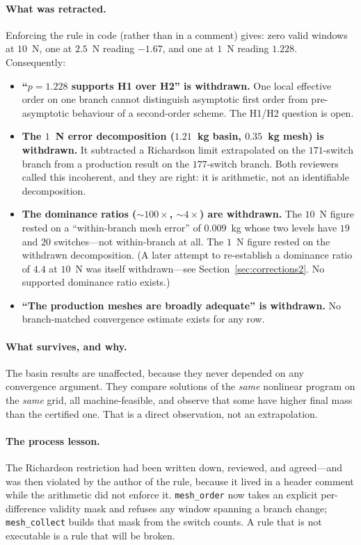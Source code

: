 \documentclass[11pt]{article}
\begin{document}
\paragraph{What was retracted.} Enforcing the rule in code (rather than in a
comment) gives: zero valid windows at $10$~N, one at $2.5$~N reading $-1.67$,
and one at $1$~N reading $1.228$. Consequently:

\begin{itemize}
  \item \textbf{``$p = 1.228$ supports H1 over H2'' is withdrawn.} One local
  effective order on one branch cannot distinguish asymptotic first order from
  pre-asymptotic behaviour of a second-order scheme. The H1/H2 question is
  open.
  \item \textbf{The $1$~N error decomposition ($1.21$~kg basin, $0.35$~kg
  mesh) is withdrawn.} It subtracted a Richardson limit extrapolated on the
  $171$-switch branch from a production result on the $177$-switch branch.
  Both reviewers called this incoherent, and they are right: it is arithmetic,
  not an identifiable decomposition.
  \item \textbf{The dominance ratios ($\sim\!100\times$, $\sim\!4\times$)
  are withdrawn.} The $10$~N figure rested on a ``within-branch mesh error'' of
  $0.009$~kg whose two levels have $19$ and $20$ switches---not within-branch
  at all. The $1$~N figure rested on the withdrawn decomposition.
  (A later attempt to re-establish a dominance ratio of $4.4$ at $10$~N was
  itself withdrawn---see Section~\ref{sec:corrections2}. No supported dominance
  ratio exists.)
  \item \textbf{``The production meshes are broadly adequate'' is
  withdrawn.} No branch-matched convergence estimate exists for any row.
\end{itemize}

\paragraph{What survives, and why.} The basin results are unaffected, because
they never depended on any convergence argument. They compare solutions of the
\emph{same} nonlinear program on the \emph{same} grid, all machine-feasible,
and observe that some have higher final mass than the certified one. That is a
direct observation, not an extrapolation.

\paragraph{The process lesson.} The Richardson restriction had been written
down, reviewed, and agreed---and was then violated by the author of the rule,
because it lived in a header comment while the arithmetic did not enforce it.
\texttt{mesh\_order} now takes an explicit per-difference validity mask and
refuses any window spanning a branch change; \texttt{mesh\_collect} builds
that mask from the switch counts. A rule that is not executable is a rule that
will be broken.
\end{document}
